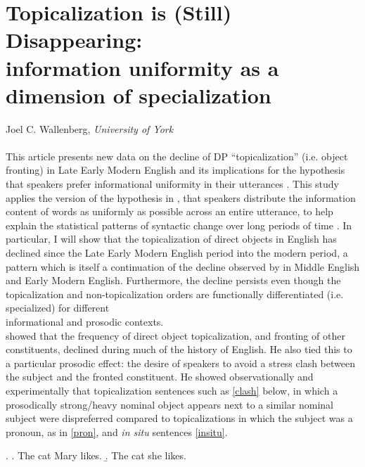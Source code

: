 \documentclass[12pt]{article}
\begin{document}
\section*{\fontsize{16}{12}\selectfont Topicalization is (Still) Disappearing: \\\fontsize{14}{12}\selectfont information uniformity as a dimension of specialization}
 \noindent \fontsize{12}{12}\selectfont Joel C. Wallenberg, \textit{University of York}\\
\\
\noindent This article presents new data on the decline of DP ``topicalization'' (i.e. object fronting) in Late Early Modern English and its implications for the hypothesis that speakers prefer informational uniformity in their utterances \citep[][\textsl{inter alia}]{fenkfenk1980,fenk1989,fenk2001, levy2005,levyjaeger2007}. This study applies the version of the hypothesis in \citet{cuskleyetal2021}, that speakers distribute the information content of words as uniformly as possible across an entire utterance, to help explain the statistical patterns of syntactic change over long periods of time \citep[in a similar way to][]{wallenbergetal2021}. In particular, I will show that the topicalization of direct objects in English has declined since the Late Early Modern English period into the modern period, a pattern which is itself a continuation of the decline observed by \citet{speyer2008, speyer2010} in Middle English and Early Modern English. Furthermore, the decline persists even though the topicalization and non-topicalization orders are functionally differentiated (i.e. specialized) for different \\informational and prosodic contexts.\\

\noindent \citet{speyer2008,speyer2010} showed that the frequency of direct object topicalization, and fronting of other constituents, declined during much of the history of English. He also tied this to a particular prosodic effect: the desire of speakers to avoid a stress clash between the subject and the fronted constituent. He showed observationally and experimentally that topicalization sentences such as \ref{clash} below, in which a prosodically strong/heavy nominal object appears next to a similar nominal subject were dispreferred compared to topicalizations in which the subject was a pronoun, as in \ref{pron}, and \textsl{in situ} sentences \ref{insitu}.


\ex. \label{exs}
\a. \label{clash} The cat Mary likes.
\b. \label{pron}	The cat she likes.
\end{document}
